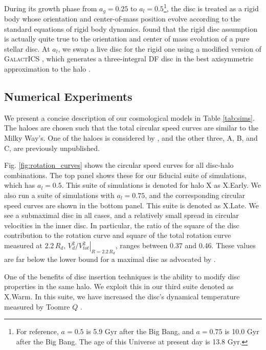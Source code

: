 
During its growth phase from $a_g=0.25$ to $a_l=0.5$\footnote{For reference, $a=0.5$ is 5.9 Gyr after the Big Bang, and $a=0.75$ is 10.0 Gyr after the Big Bang. The age of this Universe at present day is 13.8 Gyr.}, the disc is treated
as a rigid body whose orientation and center-of-mass position evolve
according to the standard equations of rigid body dynamics. \citet{bauer2018a} found that
the rigid disc assumption is actually quite true to the orientation
and center of mass evolution of a pure stellar disc. At
$a_l$, we swap a live disc for the rigid one using a modified version of
\textsc{GalactICS} \citep{KGGalactICSReference,WPDGalactICSReference}, which generates a
three-integral DF disc in the best axisymmetric approximation to the
halo \citet{bauer2018a}.


\subsection{Numerical Experiments} \label{ssec:numerical_experiments}


We present a concise description of our cosmological models in Table \ref{tab:sims}. The haloes are chosen such that the total circular speed curves are similar to the Milky Way's. One of the haloes is considered by \cite{bauer2018b}, and the other three, A, B, and C, are previously unpublished.
 
Fig. \ref{fig:rotation_curves} shows the circular speed curves for all disc-halo combinations. The top panel shows these for our fiducial suite of simulations, which has $a_l=0.5$. This suite of simulations is denoted for halo X as X.Early. We also run a suite of simulations with $a_l=0.75$, and the corresponding circular speed curves are shown in the bottom panel. This suite is denoted as X.Late. We see a submaximal disc in all cases, and a relatively small spread in circular velocities in the inner disc. In particular, the ratio of the square of the disc contribution to the rotation curve and square of the total rotation curve measured at $2.2\, R_d$, $\left. V_d^2/V_{tot}^2 \right \vert_{R=2.2\,R_d}$, ranges between 0.37 and 0.46. These values are far below the lower bound for a maximal disc as advocated by \citet{sackett_1997}. 

One of the benefits of disc insertion techniques is the ability to modify disc properties in the same halo. We exploit this in our third suite denoted as X.Warm. In this suite, we have increased the disc's dynamical temperature measured by Toomre $Q$ \citep{toomre_q}.

